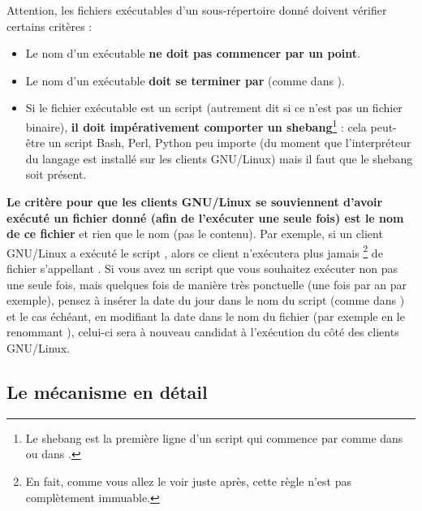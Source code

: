 Attention, les fichiers exécutables d'un sous-répertoire donné doivent
vérifier certains critères :
%
\begin{itemize}
\item Le nom d'un exécutable \textbf{ne doit pas commencer par un point}.
\item Le nom d'un exécutable \textbf{doit se terminer par }
(comme dans ).
\item Si le fichier exécutable est un script (autrement dit si ce n'est pas un fichier
binaire), \textbf{il doit impérativement comporter un shebang}\footnote{Le shebang est la
première ligne d'un script qui commence par \verbtexte{\#!} comme
dans \og {} \fg{} ou dans \og {} \fg{}.} : 
cela peut-être un script Bash, Perl, Python peu importe
(du moment que l'interpréteur du langage est installé sur les
clients GNU/Linux)
mais il faut que le shebang soit présent.
\end{itemize}
%
\textbf{Le critère pour que les clients GNU/Linux se
souviennent d'avoir exécuté un fichier donné (afin de l'exécuter une seule fois) est le
nom de ce fichier}
et rien que le nom (pas le contenu). 
Par exemple, si un client GNU/Linux a exécuté le script ,
alors ce client n'exécutera plus jamais%
%
\footnote{En fait, comme vous allez le voir juste après,
cette règle n'est pas complètement immuable.}
%
de fichier s'appellant .
Si vous avez un script que vous souhaitez exécuter
non pas une seule fois, mais quelques fois de manière très ponctuelle
(une fois par an par exemple), pensez à
insérer la date du jour dans le nom du script (comme dans )
et le cas échéant, en modifiant la date dans le nom du fichier
(par exemple en le renommant ),
celui-ci sera à nouveau
candidat à l'exécution du côté des clients GNU/Linux.



\subsection{Le mécanisme en détail}

